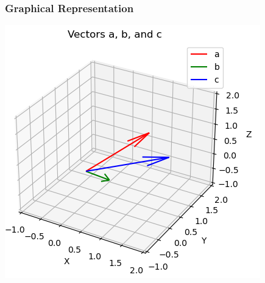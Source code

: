 \documentclass{beamer}
\theoremstyle{remark}
\numberwithin{equation}{section}
\begin{document}
\begin{frame}
	\frametitle{Graphical Representation}
	\centering
	\includegraphics[width=0.7\linewidth]{figs/fig1.png}
\end{frame}
\end{document}
